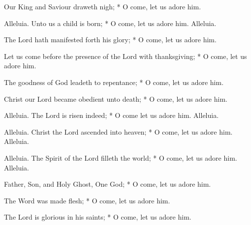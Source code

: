 \par\noindent
{} Our King and Saviour draweth nigh; * O come, let us adore him.
\par\noindent
{} Alleluia. Unto us a child is born; * O come, let us adore him. Alleluia.
\par\noindent
{} The Lord hath manifested forth his glory; * O come, let us adore him.
\par\noindent
 Let us come before the presence of the Lord with thanksgiving;  * O come, let us adore him.
\par\noindent
 The goodness of God leadeth to repentance; * O come, let us adore him.
\par\noindent
{} Christ our Lord became obedient unto death; * O come, let us adore him.
\par\noindent
{} Alleluia. The Lord is risen indeed; * O come let us adore him. Alleluia.
\par\noindent
{} Alleluia. Christ the Lord ascended into heaven; * O come, let us adore him. Alleluia.
\par\noindent
{} Alleluia. The Spirit of the Lord filleth the world; * O come, let us adore him. Alleluia.
\par\noindent
{} Father, Son, and Holy Ghost, One God; * O come, let us adore him.
\par\noindent
{} The Word was made flesh; * O come, let us adore him.
\par\noindent
 The Lord is glorious in his saints; * O come, let us adore him.

\vspace{-0.6\baselineskip}

